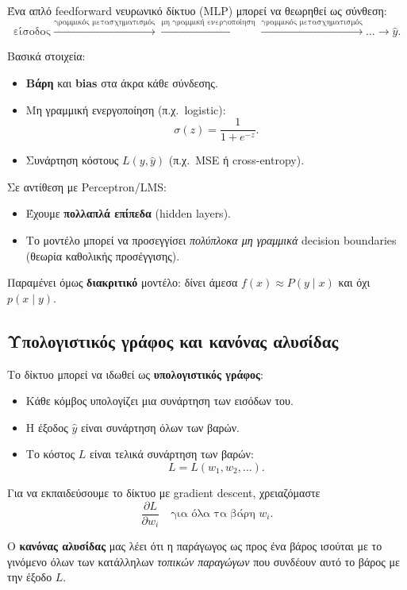 \documentclass[a4paper,11pt]{article}
\begin{document}
Ένα απλό feedforward νευρωνικό δίκτυο (MLP) μπορεί να θεωρηθεί ως
σύνθεση:
\[
\text{είσοδος} \xrightarrow{\text{γραμμικός μετασχηματισμός}}
\xrightarrow{\text{μη γραμμική ενεργοποίηση}}
\xrightarrow{\text{γραμμικός μετασχηματισμός}} \dots \xrightarrow{} \hat{y}.
\]

Βασικά στοιχεία:
\begin{itemize}
  \item \textbf{Βάρη} και \textbf{bias} στα άκρα κάθε σύνδεσης.
  \item Μη γραμμική ενεργοποίηση (π.χ.\ logistic):
        \[
          \sigma(z) = \frac{1}{1+e^{-z}}.
        \]
  \item Συνάρτηση κόστους $L(y,\hat{y})$ (π.χ.\ MSE ή cross-entropy).
\end{itemize}

Σε αντίθεση με Perceptron/LMS:
\begin{itemize}
  \item Έχουμε \textbf{πολλαπλά επίπεδα} (hidden layers).
  \item Το μοντέλο μπορεί να προσεγγίσει \emph{πολύπλοκα μη γραμμικά}
        decision boundaries (θεωρία καθολικής προσέγγισης).
\end{itemize}

Παραμένει όμως \textbf{διακριτικό} μοντέλο: δίνει άμεσα $f(x)\approx P(y\mid x)$
και όχι $p(x\mid y)$.

\subsection{Υπολογιστικός γράφος και κανόνας αλυσίδας}

Το δίκτυο μπορεί να ιδωθεί ως \textbf{υπολογιστικός γράφος}:

\begin{itemize}
  \item Κάθε κόμβος υπολογίζει μια συνάρτηση των εισόδων του.
  \item Η έξοδος $\hat{y}$ είναι συνάρτηση όλων των βαρών.
  \item Το κόστος $L$ είναι τελικά συνάρτηση των βαρών:
        \[
        L = L(w_1,w_2,\dots).
        \]
\end{itemize}

Για να εκπαιδεύσουμε το δίκτυο με gradient descent, χρειαζόμαστε
\[
\frac{\partial L}{\partial w_i}
\quad \text{για όλα τα βάρη } w_i.
\]

Ο \textbf{κανόνας αλυσίδας} μας λέει ότι η παράγωγος ως προς ένα βάρος
ισούται με το γινόμενο όλων των κατάλληλων \emph{τοπικών παραγώγων}
που συνδέουν αυτό το βάρος με την έξοδο $L$.
\end{document}
